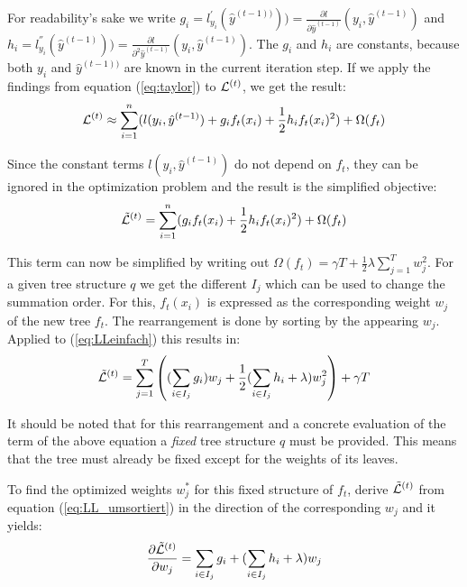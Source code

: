 For readability's sake we write $g_i = l_{y_i}^{'}(\hat{y}^{(t-1))}) ) = \frac{\partial l}{\partial \hat{y}^{(t-1)}}(y_i,\hat{y}^{(t-1)})$ and $h_i = l_{y_i}^{''}(\hat{y}^{(t-1)}) ) = \frac{\partial l}{\partial^2 \hat{y}^{(t-1)}}(y_i,\hat{y}^{(t-1)})$. The $g_i$ and $h_i$ are constants, because both $y_i$ and $\hat{y}^{(t-1))}$ are known in the current iteration step. If we apply the findings from equation (\ref{eq:taylor}) to $\mathcal{L}^{(t)}$, we get the result:
\begin{equation} \label{eq:shortL}
\mathcal{L}^{(t)} \approx \sum_{i=1}^{n} (l(y_i,\hat{y}^{(t-1)}) + g_if_t(x_i) + \frac{1}{2} h_i f_t(x_i)^2) + \Omega(f_t)
\end{equation}

Since the constant terms $l(y_i,\hat{y}^{(t-1)})$ do not depend on $f_t$, they can be ignored in the optimization problem and the result is the simplified objective:
\begin{equation} \label{eq:LLeinfach}
\tilde{\mathcal{L}}^{(t)} = \sum_{i=1}^{n}( g_if_t(x_i) + \frac{1}{2} h_i f_t(x_i)^2) + \Omega(f_t)
\end{equation}

This term can now be simplified by writing out $\Omega(f_t) = \gamma T + \frac{1}{2}\lambda \sum_{j=1}^{T} w_j^2$. For a given tree structure $q$ we get the different $I_j$ which can be used to change the summation order. For this, $f_t(x_i)$ is expressed as the corresponding weight $w_j$ of the new tree $f_t$. The rearrangement is done by sorting by the appearing $w_j$. Applied to (\ref{eq:LLeinfach}) this results in:
\begin{equation} \label{eq:LL_umsortiert}
\tilde{\mathcal{L}}^{(t)} = \sum_{j=1}^T\left( (\sum_{i \in I_j} g_i) w_j + \frac{1}{2} (\sum_{i \in I_j} h_i + \lambda)w_j^2 \right) + \gamma T
\end{equation}

It should be noted that for this rearrangement and a concrete evaluation of the term of the above equation a \textit{fixed} tree structure $q$ must be provided. This means that the tree must already be fixed except for the weights of its leaves.

To find the optimized weights $w^*_j$ for this fixed structure of $f_t$, derive $\tilde{\mathcal{L}}^{(t)}$ from equation (\ref{eq:LL_umsortiert}) in the direction of the corresponding $w_j$ and it yields:
\begin{equation} \label{eq:LL_ableitung}
\frac{\partial \tilde{\mathcal{L}}^{(t)}}{\partial w_j} = \sum_{i \in I_j} g_i + (\sum_{i \in I_j} h_i + \lambda)w_j
\end{equation}

